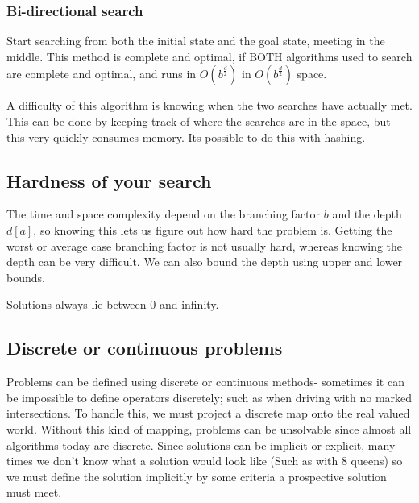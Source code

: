 \documentclass{chezarticle}
\begin{document}
\subsubsection{Bi-directional search}
\begin{algorithm}
Start searching from both the initial state and the goal state, meeting in the middle. This method is complete and optimal, if BOTH algorithms used to search are complete and optimal, and runs in $O(b^{\frac{d}{2}})$ in $O(b^{\frac{d}{2}})$ space.
\end{algorithm}
A difficulty of this algorithm is knowing when the two searches have actually met. This can be done by keeping track of where the searches are in the space, but this very quickly consumes memory. Its possible to do this with hashing.
\subsection{Hardness of your search}    
The time and space complexity depend on the branching factor $b$ and the depth $d[a]$, so knowing this lets us figure out how hard the problem is. Getting the worst or average case branching factor is not usually hard, whereas knowing the depth can be very difficult. We can also bound the depth using upper and lower bounds.
\begin{fact}
Solutions always lie between 0 and infinity. 
\end{fact}
\subsection{Discrete or continuous problems}
Problems can be defined using discrete or continuous methods- sometimes it can be impossible to define operators discretely; such as when driving with no marked intersections. To handle this, we must project a discrete map onto the real valued world. Without this kind of mapping, problems can be unsolvable since almost all algorithms today are discrete. Since solutions can be implicit or explicit, many times we don't know what a solution would look like (Such as with 8 queens) so we must define the solution implicitly by some criteria a prospective solution must meet.
\end{document}
